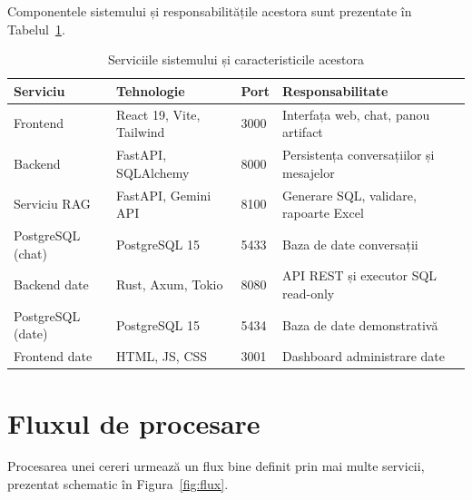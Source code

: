\documentclass[12pt, a4paper]{report}
\begin{document}
Componentele sistemului și responsabilitățile acestora sunt prezentate în Tabelul~\ref{tab:servicii}.

\begin{table}[H]
\centering
\caption{Serviciile sistemului și caracteristicile acestora}
\label{tab:servicii}
\begin{tabularx}{\textwidth}{l l l X}
\toprule
\textbf{Serviciu} & \textbf{Tehnologie} & \textbf{Port} & \textbf{Responsabilitate} \\
\midrule
Frontend & React 19, Vite, Tailwind & 3000 & Interfața web, chat, panou artifact \\
Backend & FastAPI, SQLAlchemy & 8000 & Persistența conversațiilor și mesajelor \\
Serviciu RAG & FastAPI, Gemini API & 8100 & Generare SQL, validare, rapoarte Excel \\
PostgreSQL (chat) & PostgreSQL 15 & 5433 & Baza de date conversații \\
Backend date & Rust, Axum, Tokio & 8080 & API REST și executor SQL read-only \\
PostgreSQL (date) & PostgreSQL 15 & 5434 & Baza de date demonstrativă \\
Frontend date & HTML, JS, CSS & 3001 & Dashboard administrare date \\
\bottomrule
\end{tabularx}
\end{table}

\section{Fluxul de procesare}

Procesarea unei cereri urmează un flux bine definit prin mai multe servicii, prezentat schematic în Figura~\ref{fig:flux}.
\end{document}
